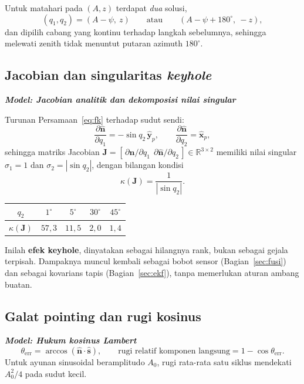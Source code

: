 \documentclass[11pt,a4paper]{article}
\newcommand{\nhat}{\hat{\bm{n}}}
\newcommand{\shat}{\hat{\bm{s}}}
\newcommand{\xp}{\hat{\bm{x}}_p}
\newcommand{\yp}{\hat{\bm{y}}_p}
\newcommand{\degg}{^\circ}
\newcommand{\model}[1]{\textbf{\textit{Model: #1}}}
\begin{document}
Untuk matahari pada $(A, z)$ terdapat \emph{dua} solusi,
\begin{equation}
(q_1, q_2) = (A - \psi,\ z) \qquad \text{atau} \qquad (A - \psi + 180\degg,\ -z),
\end{equation}
dan dipilih cabang yang kontinu terhadap langkah sebelumnya, sehingga melewati zenith tidak menuntut putaran
azimuth $180\degg$.

\subsection{Jacobian dan singularitas \emph{keyhole}}

\model{Jacobian analitik dan dekomposisi nilai singular}

Turunan Persamaan~\eqref{eq:fk} terhadap sudut sendi:
\begin{equation}
\frac{\partial \nhat}{\partial q_1} = -\sin q_2\, \yp, \qquad
\frac{\partial \nhat}{\partial q_2} = \xp,
\end{equation}
sehingga matriks Jacobian $\bm{J} = [\,\partial\nhat/\partial q_1 \ \ \partial\nhat/\partial q_2\,]
\in \mathbb{R}^{3\times 2}$ memiliki nilai singular $\sigma_1 = 1$ dan $\sigma_2 = |\sin q_2|$, dengan
bilangan kondisi
\begin{equation}
\kappa(\bm{J}) = \frac{1}{|\sin q_2|}.
\end{equation}

\begin{longtable}{c c c c c}
\toprule
$q_2$ & $1\degg$ & $5\degg$ & $30\degg$ & $45\degg$ \\
\midrule
$\kappa(\bm{J})$ & $57{,}3$ & $11{,}5$ & $2{,}0$ & $1{,}4$ \\
\bottomrule
\end{longtable}

Inilah \textbf{efek keyhole}, dinyatakan sebagai hilangnya rank, bukan sebagai gejala terpisah. Dampaknya
muncul kembali sebagai bobot sensor (Bagian~\ref{sec:fusi}) dan sebagai kovarians tapis
(Bagian~\ref{sec:ekf}), tanpa memerlukan aturan ambang buatan.

\subsection{Galat pointing dan rugi kosinus}

\model{Hukum kosinus Lambert}
\begin{equation}
\theta_{\mathrm{err}} = \arccos\!\left( \nhat \cdot \shat \right), \qquad
\text{rugi relatif komponen langsung} = 1 - \cos\theta_{\mathrm{err}}.
\label{eq:cosloss}
\end{equation}
Untuk ayunan sinusoidal beramplitudo $A_0$, rugi rata-rata satu siklus mendekati $A_0^2/4$ pada sudut kecil.
\end{document}
